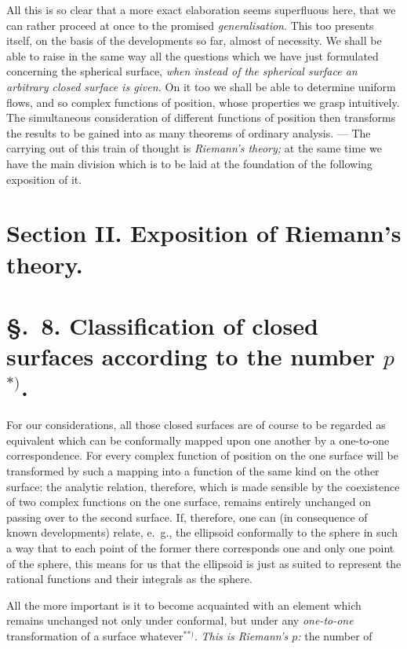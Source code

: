 \documentclass{article}
\begin{document}
All this is so clear that a more exact elaboration seems superfluous here, that we can rather proceed at once to the promised \emph{generalisation}. This too presents itself, on the basis of the developments so far, almost of necessity. We shall be able to raise in the same way all the questions which we have just formulated concerning the spherical surface, \emph{when instead of the spherical surface an arbitrary closed surface is given.} On it too we shall be able to determine uniform flows, and so complex functions of position, whose properties we grasp intuitively. The simultaneous consideration of different functions of position then transforms the results to be gained into as many theorems of ordinary analysis. --- The carrying out of this train of thought is \emph{Riemann's theory;} at the same time we have the main division which is to be laid at the foundation of the following exposition of it.


\section*{Section II. Exposition of Riemann's theory.}

\section*{§.~8. Classification of closed surfaces according to the number $p$${}^{*)}$.}

For our considerations, all those closed surfaces are of course to be regarded as equivalent which can be conformally mapped upon one another by a one-to-one correspondence. For every complex function of position on the one surface will be transformed by such a mapping into a function of the same kind on the other surface: the analytic relation, therefore, which is made sensible by the coexistence of two complex functions on the one surface, remains entirely unchanged on passing over to the second surface. If, therefore, one can (in consequence of known developments) relate, e.\ g., the ellipsoid conformally to the sphere in such a way that to each point of the former there corresponds one and only one point of the sphere, this means for us that the ellipsoid is just as suited to represent the rational functions and their integrals as the sphere.

All the more important is it to become acquainted with an element which remains unchanged not only under conformal, but under any \emph{one-to-one} transformation of a surface whatever${}^{**)}$. \emph{This is Riemann's $p$:} the number of
\end{document}
